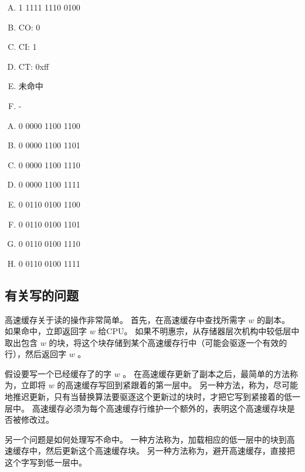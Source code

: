 {    %
    \begin{practicec}
        \begin{enumerate}[A.]
            \item 1 1111 1110 0100
            \item CO: 0
            \item CI: 1
            \item CT: 0xff
            \item 未命中
            \item -
        \end{enumerate}
    \end{practicec}

    \begin{practicec}
        \begin{enumerate}[A.]
            \item 0 0000 1100 1100
            \item 0 0000 1100 1101
            \item 0 0000 1100 1110
            \item 0 0000 1100 1111
            \item 0 0110 0100 1100
            \item 0 0110 0100 1101
            \item 0 0110 0100 1110
            \item 0 0110 0100 1111
        \end{enumerate}
    \end{practicec}

    \subsection{有关写的问题}
    {
        高速缓存关于读的操作非常简单。
        首先，在高速缓存中查找所需字 $w$ 的副本。
        如果命中，立即返回字 $w$ 给CPU。
        如果不明惠宗，从存储器层次机构中较低层中取出包含 $w$ 的块，将这个块存储到某个高速缓存行中（可能会驱逐一个有效的行），然后返回字 $w$ 。

        假设要写一个已经缓存了的字 $w$  。
        在高速缓存更新了副本之后，最简单的方法称为，立即将 $w$ 的高速缓存写回到紧跟着的第一层中。
        另一种方法，称为，尽可能地推迟更新，只有当替换算法要驱逐这个更新过的块时，才把它写到紧接着的低一层中。
        高速缓存必须为每个高速缓存行维护一个额外的，表明这个高速缓存块是否被修改过。

        另一个问题是如何处理写不命中。
        一种方法称为，加载相应的低一层中的块到高速缓存中，然后更新这个高速缓存块。
        另一种方法称为，避开高速缓存，直接把这个字写到低一层中。
    }

}
